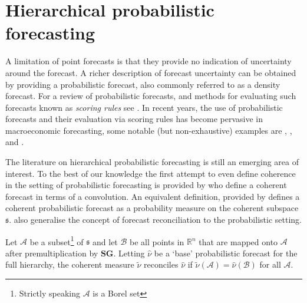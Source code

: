 \documentclass[graybox]{svmult}
\begin{document}
\section{Hierarchical probabilistic forecasting}

A limitation of point forecasts is that they provide no indication of uncertainty around the forecast. A richer description of forecast uncertainty can be obtained by providing a probabilistic forecast, also commonly referred to as a density forecast. For a review of probabilistic forecasts, and methods for evaluating such forecasts known as {\em scoring rules} see  \citep{Gneiting2014}. In recent years, the use of probabilistic forecasts and their evaluation via scoring rules has become pervasive in macroeconomic forecasting, some notable (but non-exhaustive) examples are \cite{GewAmi2010}, \cite{BilEtAl2013}, \cite{CarEtAl2015} and \cite{ClaRav2015}.


The literature on hierarchical probabilistic forecasting is still an emerging area of interest. %
To the best of our knowledge the first attempt to even define coherence in the setting of probabilistic forecasting is provided by \cite{Taieb2017} who define a coherent forecast in terms of a convolution.  An equivalent definition, provided by \cite{GamEtAl2018} defines a  coherent probabilistic forecast as a probability measure on the coherent subspace $\mathfrak{s}$.  \cite{GamEtAl2018} also generalise the concept of forecast reconciliation to the probabilistic setting.

\begin{definition} Let $\mathcal{A}$ be a subset\footnote{Strictly speaking $\mathcal{A}$ is a Borel set} of $\mathfrak{s}$ and let $\mathcal{B}$ be all points in $\mathbb{R}^n$ that are mapped onto  $\mathcal{A}$ after premultiplication by $\bm{S}\bm{G}$. Letting $\hat{\nu}$ be a `base' probabilistic forecast for the full hierarchy, the coherent measure $\tilde{\nu}$ reconciles $\hat{\nu}$ if $\tilde{\nu}(\mathcal{A})=\hat{\nu}(\mathcal{B})$ for all $\mathcal{A}$.
\end{definition}
\end{document}
